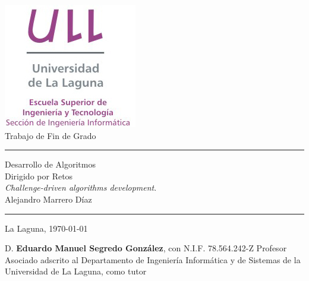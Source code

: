 \documentclass[spanish,a4paper,14pt,oneside]{extreport}
\begin{document}

\pagestyle{empty}
\thispagestyle{empty}


\newcommand{\HRule}{\rule{\linewidth}{1mm}}
\setlength{\parindent}{0mm}
\setlength{\parskip}{0mm}


\begin{center}
\includegraphics[scale=0.8]{images/logo_vertical}\\[10mm]
{\Huge Trabajo de Fin de Grado}
\end{center}

\HRule
\begin{flushright}
        {\Huge Desarrollo de Algoritmos \\ Dirigido por Retos} \\[2.5mm]
        {\Large \textit{Challenge-driven algorithms development}.} \\[5mm]
        {\Large Alejandro Marrero Díaz} \\[5mm]


\end{flushright}
\HRule
{}
\begin{center}
  \Large La Laguna, \today
\end{center}

\setlength{\parindent}{5mm}

\newpage
\thispagestyle{empty}

D. {\bf Eduardo Manuel Segredo González}, con N.I.F. 78.564.242-Z
Profesor 
Asociado adscrito al Departamento 
de Ingeniería Informática y de Sistemas
de la Universidad de La Laguna, como tutor
\end{document}
